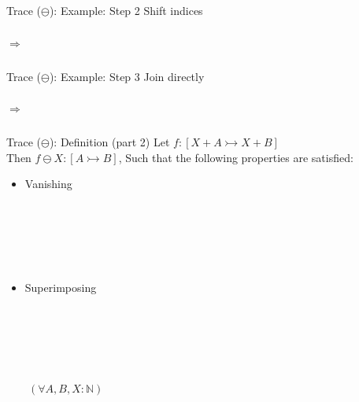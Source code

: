 \documentclass[aspectratio=169,16pt]{beamer}
\begin{document}
\begin{frame}{Trace ($\ominus$): Example: Step 2 Shift indices}
  \begin{columns}[T,onlytextwidth]
  \centering
  \resizebox{0.5\linewidth}{!}{\TraceStepOne}

  \centering \Large $\Longrightarrow$

  \centering
  \resizebox{0.5\linewidth}{!}{\TraceStepTwo}
  \end{columns}
\end{frame}

\begin{frame}{Trace ($\ominus$): Example: Step 3 Join directly}
  \begin{columns}[T,onlytextwidth]
  \centering
  \resizebox{0.5\linewidth}{!}{\TraceStepTwo}

  \centering \Large $\Longrightarrow$

  \centering
  \resizebox{0.3\linewidth}{!}{\TraceStepThree}
  \end{columns}
\end{frame}

\begin{frame}{Trace ($\ominus$): Definition (part 2)}
  Let $f : [X + A \rightarrowtail X + B]$ \\
  Then $f \ominus X : [ A \rightarrowtail B ]$,
  Such that the following properties are satisfied:
  \begin{itemize}
  \item Vanishing
  \\~\\~\\~\\~\\~\\
  \item Superimposing
  \\~\\~\\~\\~\\~\\
  \end{itemize} $\qquad (\forall A,B,X : \mathbb{N})$
\end{frame}
\end{document}
